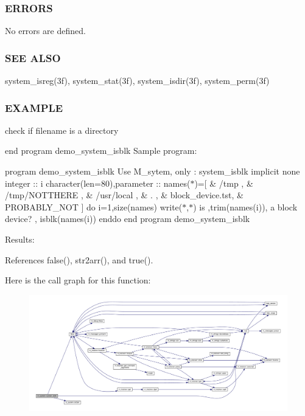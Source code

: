 \subsubsection*{E\+R\+R\+O\+RS}

No errors are defined.

\subsubsection*{S\+EE A\+L\+SO}

system\+\_\+isreg(3f), system\+\_\+stat(3f), system\+\_\+isdir(3f), system\+\_\+perm(3f)

\subsubsection*{E\+X\+A\+M\+P\+LE}

check if filename is a directory

end program demo\+\_\+system\+\_\+isblk Sample program\+:

program demo\+\_\+system\+\_\+isblk Use M\+\_\+sytem, only \+: system\+\_\+isblk implicit none integer \+:\+: i character(len=80),parameter \+:\+: names($\ast$)=\mbox{[} \& \textquotesingle{}/tmp \textquotesingle{}, \& \textquotesingle{}/tmp/\+N\+O\+T\+T\+H\+E\+RE \textquotesingle{}, \& \textquotesingle{}/usr/local \textquotesingle{}, \& \textquotesingle{}. \textquotesingle{}, \& \textquotesingle{}block\+\_\+device.\+tst\textquotesingle{}, \& \textquotesingle{}P\+R\+O\+B\+A\+B\+L\+Y\+\_\+\+N\+OT \textquotesingle{}\mbox{]} do i=1,size(names) write($\ast$,$\ast$)\textquotesingle{} is \textquotesingle{},trim(names(i)),\textquotesingle{} a block device? \textquotesingle{}, isblk(names(i)) enddo end program demo\+\_\+system\+\_\+isblk

Results\+: 

References false(), str2arr(), and true().

Here is the call graph for this function\+:
\nopagebreak
\begin{figure}[H]
\begin{center}
\leavevmode
\includegraphics[width=350pt]{namespacem__system_a791fa587005ec07cbcd7b0045ee6f43f_cgraph}
\end{center}
\end{figure}
\mbox{\label{namespacem__system_a12a948fa4aacda084a538ae3a5ae3cc6}} 
